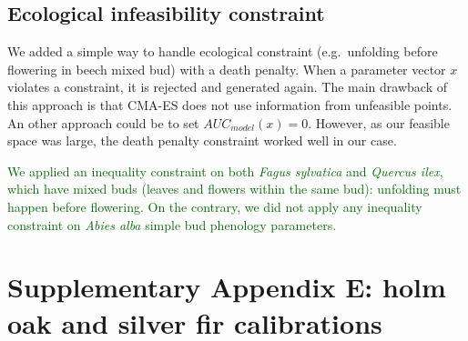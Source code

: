 \documentclass[11pt,]{article}
\begin{document}
\hypertarget{ecological-infeasibility-constraint}{%
\subsection{Ecological infeasibility
constraint}\label{ecological-infeasibility-constraint}}

We added a simple way to handle ecological constraint (e.g.~unfolding
before flowering in beech mixed bud) with a death penalty. When a
parameter vector \(x\) violates a constraint, it is rejected and
generated again. The main drawback of this approach is that CMA-ES does
not use information from unfeasible points. An other approach could be
to set \(AUC_{model}(x)=0\). However, as our feasible space was large,
the death penalty constraint worked well in our case.

\textcolor{darkgreen}{We applied an inequality constraint on both \textit{Fagus sylvatica} and \textit{Quercus ilex}, which have mixed buds (leaves and flowers within the same bud): unfolding must happen before flowering. On the contrary, we did not apply any inequality constraint on \textit{Abies alba} simple bud phenology parameters.}

\newpage

\hypertarget{appendixE}{%
\section{Supplementary Appendix E: holm oak and silver fir
calibrations}\label{appendixE}}

\renewcommand*\thetable{E.\arabic{table}}
\renewcommand*\thefigure{E.\arabic{figure}}

\setcounter{figure}{0}
\setcounter{table}{0}

\renewcommand*{\thepage}{E--\arabic{page}}

\hfill \break
\end{document}

